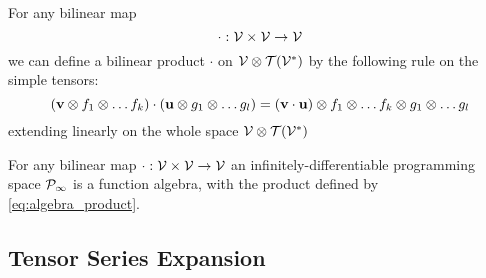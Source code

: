 \begin{definition}
 For any bilinear map
 $$\cdot :\mathcal{V}\times \mathcal{V}\to \mathcal{V}$$
 we can define a
 bilinear product $\cdot$ on $\mathcal{V}\otimes \mathcal{T}(\mathcal{V}^*)$ by the following rule on the
 simple tensors:
 \begin{equation}
   \label{eq:algebra_product}
   (\mathbf{v}\otimes f_1\otimes\ldots f_k) \cdot (\mathbf{u}\otimes g_1\otimes\ldots g_l)=
(\mathbf{v}\cdot \mathbf{u})\otimes f_1\otimes\ldots f_k\otimes g_1\otimes\ldots g_l 
 \end{equation}
extending linearly on the whole space $\mathcal{V}\otimes\mathcal{T}(\mathcal{V}^*)$
\end{definition}
\begin{theorem}\label{izr:alg}
 For any bilinear map $\cdot :\mathcal{V}\times \mathcal{V}\to \mathcal{V}$ an infinitely-differentiable
 programming space $\mathcal{P}_\infty$ is a function algebra, with the product defined
 by \eqref{eq:algebra_product}.
\end{theorem}

 \subsection{Tensor Series Expansion}\label{sec:Vrsta}


